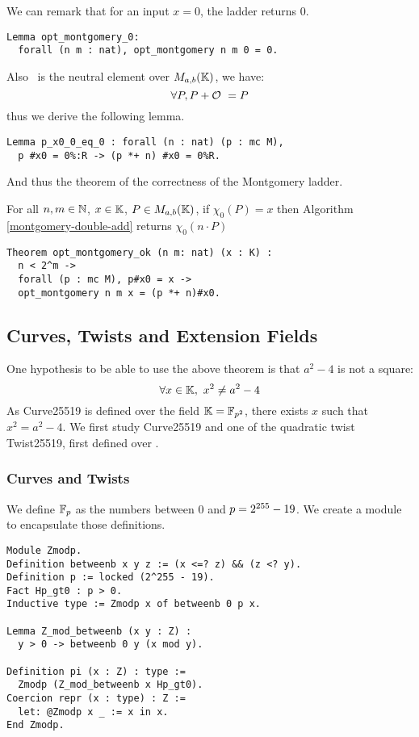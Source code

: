 We can remark that for an input $x = 0$, the ladder returns $0$.
\begin{lstlisting}[language=Coq]
Lemma opt_montgomery_0:
  forall (n m : nat), opt_montgomery n m 0 = 0.
\end{lstlisting}
Also \Oinf\ is the neutral element over $M_{a,b}(\mathbb{K})$, we have:
$$\forall P, P + \mathcal{O}\ = P$$
thus we derive the following lemma.
\begin{lstlisting}[language=Coq]
Lemma p_x0_0_eq_0 : forall (n : nat) (p : mc M),
  p #x0 = 0%:R -> (p *+ n) #x0 = 0%R.
\end{lstlisting}
And thus the theorem of the correctness of the Montgomery ladder.
\begin{theorem}
\label{montgomery-ladder-correct}
For all $n, m \in \mathbb{N}$, $x \in \mathbb{K}$, $P \in M_{a,b}(\mathbb{K})$,
if $\chi_0(P) = x$ then Algorithm \ref{montgomery-double-add} returns $\chi_0(n \cdot P)$
\end{theorem}
\begin{lstlisting}[language=Coq]
Theorem opt_montgomery_ok (n m: nat) (x : K) :
  n < 2^m ->
  forall (p : mc M), p#x0 = x ->
  opt_montgomery n m x = (p *+ n)#x0.
\end{lstlisting}

\subsection{Curves, Twists and Extension Fields}

One hypothesis to be able to use the above theorem is that $a^2-4$ is not a square:
$$\forall x \in \mathbb{K},\ x^2 \neq a^2-4$$
As Curve25519 is defined over the field $\mathbb{K} = \mathbb{F}_{p^2}$, there exists $x$ such that $x^2 = a^2-4$.
We first study Curve25519 and one of the quadratic twist Twist25519, first defined over .

\subsubsection{Curves and Twists}

We define $\mathbb{F}_{p}$ as the numbers between $0$ and $p = 2^{255}-19$.
We create a  module to encapsulate those definitions.
\begin{lstlisting}[language=Coq]
Module Zmodp.
Definition betweenb x y z := (x <=? z) && (z <? y).
Definition p := locked (2^255 - 19).
Fact Hp_gt0 : p > 0.
Inductive type := Zmodp x of betweenb 0 p x.

Lemma Z_mod_betweenb (x y : Z) :
  y > 0 -> betweenb 0 y (x mod y).

Definition pi (x : Z) : type :=
  Zmodp (Z_mod_betweenb x Hp_gt0).
Coercion repr (x : type) : Z :=
  let: @Zmodp x _ := x in x.
End Zmodp.
\end{lstlisting}

